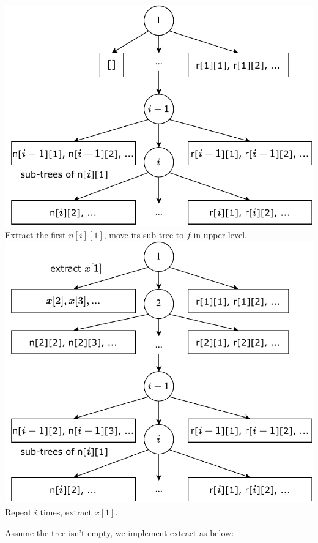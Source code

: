 \documentclass[b5paper]{article}
\begin{document}
\begin{Answer}[ref = {ex:finger-tree-del}]
{\begin{center}
  \includegraphics[scale=0.5]{img/ftr-illed-2} \\
  Extract the first $n[i][1]$, move its sub-tree to $f$ in upper level.\\
  \includegraphics[scale=0.5]{img/ftr-illed-i} \\
  Repeat $i$ times, extract $x[1]$. \\
  \label{fig:ftr-illed-extract}
\end{center}

Assume the tree isn't empty, we implement extract as below:

}
\end{Answer}
\end{document}
